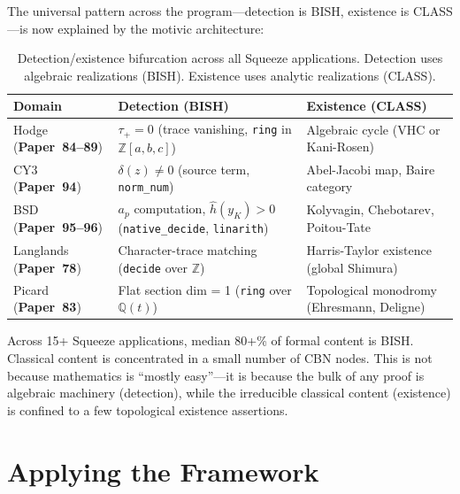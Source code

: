 \documentclass[11pt,twoside,openany]{report}
\theoremstyle{remark}
\newcommand{\BISH}{\textsf{BISH}}
\newcommand{\CLASS}{\textsf{CLASS}}
\newcommand{\paperref}[1]{\textbf{Paper~#1}}
\begin{document}
The universal pattern across the program---detection is \BISH, existence is \CLASS---is now explained by the motivic architecture:

\begin{table}[htbp]
\centering\small
\caption{Detection/existence bifurcation across all Squeeze applications. Detection uses algebraic realizations (\BISH). Existence uses analytic realizations (\CLASS).}
\label{tab:detection-existence}
\renewcommand{\arraystretch}{1.3}
\begin{tabular}{@{}l p{4cm} p{4cm}@{}}
\toprule
\textbf{Domain} & \textbf{Detection (\BISH)} & \textbf{Existence (\CLASS)} \\
\midrule
\rowcolor{green!4}
Hodge (\paperref{84--89}) & $\tau_+ = 0$ (trace vanishing, \texttt{ring} in $\mathbb{Z}[a,b,c]$) & Algebraic cycle (VHC or Kani-Rosen) \\
\rowcolor{green!4}
CY3 (\paperref{94}) & $\delta(z) \neq 0$ (source term, \texttt{norm\_num}) & Abel-Jacobi map, Baire category \\
\rowcolor{green!4}
BSD (\paperref{95--96}) & $a_p$ computation, $\hat{h}(y_K) > 0$ (\texttt{native\_decide}, \texttt{linarith}) & Kolyvagin, Chebotarev, Poitou-Tate \\
\rowcolor{green!4}
Langlands (\paperref{78}) & Character-trace matching (\texttt{decide} over $\mathbb{Z}$) & Harris-Taylor existence (global Shimura) \\
\rowcolor{green!4}
Picard (\paperref{83}) & Flat section dim = 1 (\texttt{ring} over $\mathbb{Q}(t)$) & Topological monodromy (Ehresmann, Deligne) \\
\bottomrule
\end{tabular}
\end{table}

\begin{thesisbox}
Across 15+ Squeeze applications, median 80+\% of formal content is \BISH. Classical content is concentrated in a small number of CBN nodes. This is not because mathematics is ``mostly easy''---it is because the bulk of any proof is algebraic machinery (detection), while the irreducible classical content (existence) is confined to a few topological existence assertions.
\end{thesisbox}


\chapter{Applying the Framework}
\end{document}
